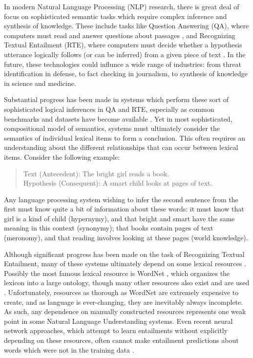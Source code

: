 \documentclass[12pt]{article}
\begin{document}
In modern Natural Language Processing (NLP) research, there is great deal of
focus on sophisticated semantic tasks which require complex inference and
synthesis of knowledge. These include tasks like Question Answering (QA), where
computers must read and answer questions about passages
\cite{hermann:2015:nips,weston:2016:iclr}, and Recognizing Textual Entailment
(RTE), where computers must decide whether a hypothesis utterance logically
follows (or can be inferred) from a given piece of text
\cite{dagan:2006:mlc,marelli:2014:semeval,bowman:2015:emnlp}. In the future,
these technologies could influnce a wide range of industries: from threat
identification in defense, to fact checking in journalism, to
synthesis of knowledge in science and medicine.

Substantial progress has been made in systems which perform these sort of
sophisticated logical inferences in QA and RTE, especially as common benchmarks
and datasets have become available
\cite{dagan:2006:mlc,giampiccolo:2007:pascal,bentivogli:2009:tac,marelli:2014:semeval,bowman:2015:emnlp}.
Yet in most sophisticated, compositional model of semantics, systems must
ultimately consider the semantics of individual lexical items to form a
conclusion. This often requires an understanding about the different
relationships that can occur between lexical items. Consider the following
example:
\begin{quote}
  Text (Antecedent): The bright girl reads a book.\\
  Hypothesis (Consequent): A smart child looks at pages of text.
\end{quote}
Any language processing system wishing to infer the second sentence from the
first must know quite a bit of information about these words: it must know that
girl is a kind of child (hypernymy), and that bright and smart have the same
meaning in this context (synonymy); that books contain pages of text
(meronomy), and that reading involves looking at these pages (world knowledge).

Although significant progress has been made on the task of Recognizing Textual
Entailment, many of these systems ultimately depend on some lexical resources
\cite{beltagy:2014:semeval,bjerva:2014:semeval,lai:2014:semeval,marelli:2014:semeval,beltagy:2016:cl}.
Possibly the most famous lexical resource is WordNet \cite{miller:1995:acm},
which organizes the lexicon into a large ontology,
though many other resources also exist and are used
\cite{baker:1998:acl,baroni:2011:gems,baroni:2012:eacl,ganitkevitch:2013:naacl,jurgens:2012:semeval,levy:2014:conll,turney:2015:nle}.
Unfortunately, resources as thorough as WordNet are extremely expensive
to create, and as language is ever-changing, they are inevitably
always incomplete. As such, any dependence on manually constructed resources
represents one weak point in some Natural Language Understanding systems. Even
recent neural network approaches, which attempt to learn entailments without
explicitly depending on these resources, often cannot make entailment
predictions about words which were not in the training data
\cite{bowman:2015:emnlp,cheng:2016:arxiv}.
\end{document}
